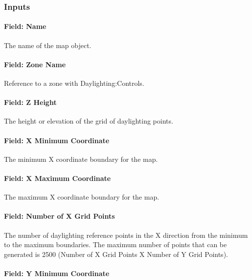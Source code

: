 \subsubsection{Inputs}\label{inputs-4-006}

\paragraph{Field: Name}\label{field-name-2-007}

The name of the map object.

\paragraph{Field: Zone Name}\label{field-zone-name-2-000}

Reference to a zone with Daylighting:Controls.

\paragraph{Field: Z Height}\label{field-z-height}

The height or elevation of the grid of daylighting points.

\paragraph{Field: X Minimum Coordinate}\label{field-x-minimum-coordinate}

The minimum X coordinate boundary for the map.

\paragraph{Field: X Maximum Coordinate}\label{field-x-maximum-coordinate}

The maximum X coordinate boundary for the map.

\paragraph{Field: Number of X Grid Points}\label{field-number-of-x-grid-points}

The number of daylighting reference points in the X direction from the minimum to the maximum boundaries. The maximum number of points that can be generated is 2500 (Number of X Grid Points X Number of Y Grid Points).

\paragraph{Field: Y Minimum Coordinate}\label{field-y-minimum-coordinate}

